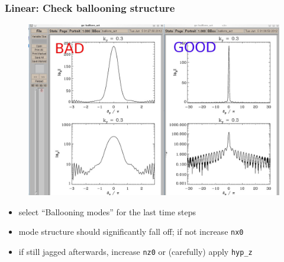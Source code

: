 \documentclass[9pt]{beamer}
\begin{document}
\begin{frame}
  \frametitle{Linear: Check ballooning structure}

\begin{figure}
\includegraphics[height=0.6\textheight]{figs/ballooning.jpg}
\end{figure}

\begin{block}{}
\begin{itemize}
 \item select ``Ballooning modes'' for the last time steps
 \item mode structure should significantly fall off; if not increase {\tt nx0}
 \item if still jagged afterwards, increase {\tt nz0} or (carefully) apply {\tt hyp\_z}
\end{itemize}

\end{block}

\end{frame}

\end{document}
